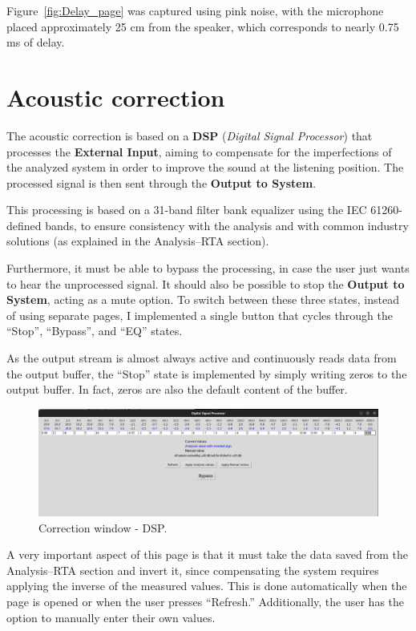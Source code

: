 Figure~\ref{fig:Delay_page} was captured using pink noise, with the microphone placed approximately 25 cm from the speaker, which corresponds to nearly 0.75 ms of delay.


\section{Acoustic correction}

The acoustic correction is based on a \textbf{DSP} (\textit{Digital Signal Processor}) that processes the \textbf{External Input}, aiming to compensate for the imperfections of the analyzed system in order to improve the sound at the listening position. The processed signal is then sent through the \textbf{Output to System}.

This processing is based on a 31-band filter bank equalizer using the IEC 61260-defined bands, to ensure consistency with the analysis and with common industry solutions (as explained in the Analysis–RTA section).

Furthermore, it must be able to bypass the processing, in case the user just wants to hear the unprocessed signal. It should also be possible to stop the \textbf{Output to System}, acting as a mute option. To switch between these three states, instead of using separate pages, I implemented a single button that cycles through the “Stop”, “Bypass”, and “EQ” states.

As the output stream is almost always active and continuously reads data from the output buffer, the “Stop” state is implemented by simply writing zeros to the output buffer. In fact, zeros are also the default content of the buffer.

\begin{figure}[H]
	\centering
	\includegraphics[width=1
	\linewidth]{Figures/DSP_page.png}
	\caption{Correction window - DSP.}
	\label{fig:DSP_page}
\end{figure}

A very important aspect of this page is that it must take the data saved from the Analysis–RTA section and invert it, since compensating the system requires applying the inverse of the measured values. This is done automatically when the page is opened or when the user presses “Refresh.” Additionally, the user has the option to manually enter their own values.


